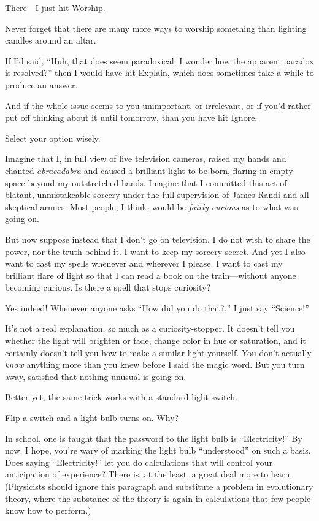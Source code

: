 {
 There---I just hit Worship.}

{
 Never forget that there are many more ways to worship something
than lighting candles around an altar.}

{
 If I'd said, ``Huh, that does
seem paradoxical. I wonder how the apparent paradox is
resolved?'' then I would have hit Explain, which does
sometimes take a while to produce an answer.}

{
 And if the whole issue seems to you unimportant, or irrelevant, or
if you'd rather put off thinking about it until
tomorrow, than you have hit Ignore.}

{
 Select your option wisely.}

\myendsectiontext


{
 Imagine that I, in full view of live television cameras, raised my
hands and chanted \textit{abracadabra} and caused a brilliant light to
be born, flaring in empty space beyond my outstretched hands. Imagine
that I committed this act of blatant, unmistakeable sorcery under the
full supervision of James Randi and all skeptical armies. Most people,
I think, would be \textit{fairly curious} as to what was going on. }

{
 But now suppose instead that I don't go on
television. I do not wish to share the power, nor the truth behind it.
I want to keep my sorcery secret. And yet I also want to cast my spells
whenever and wherever I please. I want to cast my brilliant flare of
light so that I can read a book on the train---without anyone becoming
curious. Is there a spell that stops curiosity?}

{
 Yes indeed! Whenever anyone asks ``How did you do
that?,'' I just say
``Science!''}

{
 It's not a real explanation, so much as a
curiosity-stopper. It doesn't tell you whether the
light will brighten or fade, change color in hue or saturation, and it
certainly doesn't tell you how to make a similar light
yourself. You don't actually \textit{know} anything
more than you knew before I said the magic word. But you turn away,
satisfied that nothing unusual is going on.}

{
 Better yet, the same trick works with a standard light switch.}

{
 Flip a switch and a light bulb turns on. Why?}

{
 In school, one is taught that the password to the light bulb is
``Electricity!'' By now, I hope,
you're wary of marking the light bulb
``understood'' on such a basis. Does
saying ``Electricity!'' let you do
calculations that will control your anticipation of experience? There
is, at the least, a great deal more to learn. (Physicists should ignore
this paragraph and substitute a problem in evolutionary theory, where
the substance of the theory is again in calculations that few people
know how to perform.)}

